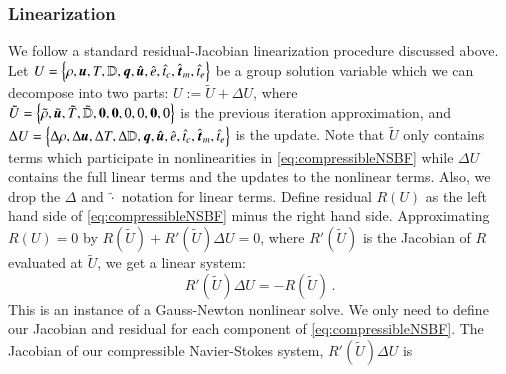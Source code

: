 \documentclass[preprint,12pt]{elsarticle}
\begin{document}
\subsubsection{Linearization}
We follow a standard residual-Jacobian linearization procedure discussed above.
Let $U=\left\{ \rho,\boldsymbol u,T,\mathbb{D},\boldsymbol q,\hat{\boldsymbol u},\hat e,\hat t_c,\hat{\boldsymbol t}_m,\hat t_e \right\}$ be a group solution variable which we can decompose into two parts:
$U:=\tilde U+\Delta U$, where\\
$\tilde U = \left\{ \tilde\rho,\tilde{\boldsymbol u},\tilde T,\tilde{\mathbb{D}},\boldsymbol{0},\boldsymbol{0},0,0,\boldsymbol{0},0 \right\}$ is the previous iteration approximation, 
and $\Delta U=\left\{ \Delta\rho,\Delta\boldsymbol u,\Delta T,\Delta\mathbb{D},\boldsymbol q,\hat{\boldsymbol u},\hat e,\hat t_c,\hat{\boldsymbol t}_m,\hat t_e \right\}$ is the update.
Note that $\tilde U$ only contains terms which participate in nonlinearities in \eqref{eq:compressibleNSBF} 
while $\Delta U$ contains the full linear terms and the updates to the nonlinear terms.
Also, we drop the $\Delta$ and $\tilde\cdot$ notation for linear terms.
Define residual $R(U)$ as the left hand side of \eqref{eq:compressibleNSBF} minus the right hand side.
Approximating $R(U)=0$ by $R(\tilde U)+R'(\tilde U)\Delta U=0$, where $R'(\tilde U)$ is the Jacobian of $R$ evaluated at $\tilde U$, we get a linear system:
\begin{equation}
	R'(\tilde U)\Delta U=-R(\tilde U)\,.
\end{equation}
This is an instance of a Gauss-Newton nonlinear solve.
We only need to define our Jacobian and residual for each component of \eqref{eq:compressibleNSBF}. 
The Jacobian of our compressible Navier-Stokes system, $R'(\tilde U)\Delta U$ is
\scriptsize
\end{document}
